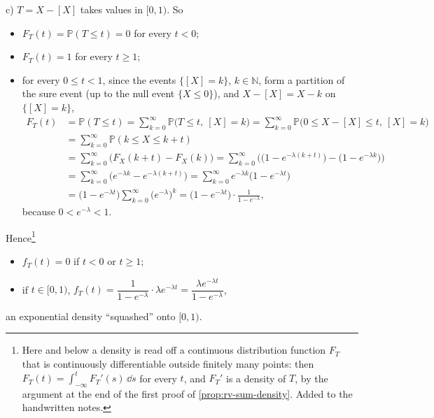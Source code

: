 \begin{example}
c) $T=X-[X]$ takes values in $[0,1)$. So
\begin{itemize}
  \item $F_T(t)=\mathbb P(T\le t)=0$ for every $t<0$;
  \item $F_T(t)=1$ for every $t\ge1$;
  \item for every $0\le t<1$, since the events $\{[X]=k\}$, $k\in\mathbb N$, form a partition of the
    sure event (up to the null event $\{X\le0\}$), and $X-[X]=X-k$ on $\{[X]=k\}$,
    \[
    \begin{aligned}
      F_T(t)&=\mathbb P(T\le t)=\sum_{k=0}^\infty\mathbb P\big(T\le t,\ [X]=k\big)
      =\sum_{k=0}^\infty\mathbb P\big(0\le X-[X]\le t,\ [X]=k\big)\\
      &=\sum_{k=0}^\infty\mathbb P(k\le X\le k+t)\\
      &=\sum_{k=0}^\infty\big(F_X(k+t)-F_X(k)\big)=\sum_{k=0}^\infty\Big(\big(1-e^{-\lambda(k+t)}\big)-\big(1-e^{-\lambda k}\big)\Big)\\
      &=\sum_{k=0}^\infty\big(e^{-\lambda k}-e^{-\lambda(k+t)}\big)
      =\sum_{k=0}^\infty e^{-\lambda k}\big(1-e^{-\lambda t}\big)\\
      &=\big(1-e^{-\lambda t}\big)\sum_{k=0}^\infty\big(e^{-\lambda}\big)^k
      =\big(1-e^{-\lambda t}\big)\cdot\frac1{1-e^{-\lambda}},
    \end{aligned}
    \]
    because $0<e^{-\lambda}<1$.
\end{itemize}
Hence\footnote{Here and below a density is read off a continuous distribution function $F_T$ that is
continuously differentiable outside finitely many points: then $F_T(t)=\int_{-\infty}^tF_T'(s)\,\dd s$
for every $t$, and $F_T'$ is a density of $T$, by the argument at the end of the first proof of
\cref{prop:rv-sum-density}. Added to the handwritten notes.}
\begin{itemize}
  \item $f_T(t)=0$ if $t<0$ or $t\ge1$;
  \item if $t\in[0,1)$, $f_T(t)=\dfrac1{1-e^{-\lambda}}\cdot\lambda e^{-\lambda t}=\dfrac{\lambda e^{-\lambda t}}{1-e^{-\lambda}}$,
\end{itemize}
an exponential density ``squashed'' onto $[0,1)$.
\end{example}

